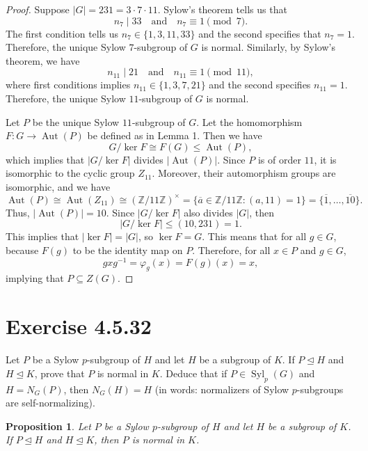 \documentclass[12pt]{article}
\newenvironment{problem}
    {\begin{lrbox}{\mybox}\begin{minipage}{0.98\textwidth}}
    {\end{minipage}\end{lrbox}\framebox[\textwidth]{\usebox{\mybox}}}
\newtheorem{proposition}{Proposition}
\newcommand{\isp}[1]{\quad\text{#1}\quad}
\newcommand{\Z}{\mathbb{Z}}
\renewcommand{\phi}{\varphi}
\newcommand{\teq}{\trianglelefteq}
\newcommand{\Syl}{\operatorname{Syl}}
\newcommand{\<}{\left\langle}
\renewcommand{\>}{\right\rangle}
\newcommand{\Aut}{\operatorname{Aut}}
\newcommand{\isom}{\cong}
\begin{document}
\begin{proof}
    Suppose $|G| = 231 = 3 \cdot 7 \cdot 11$. Sylow's theorem tells us that
    \[
        n_7 \mid 33 \isp{and} n_7 \equiv 1 \pmod{7}.
    \]
    The first condition tells us $n_7 \in \{1, 3, 11, 33\}$ and the second specifies that $n_7 = 1$. Therefore, the unique Sylow $7$-subgroup of $G$ is normal. Similarly, by Sylow's theorem, we have
    \[
        n_{11} \mid 21 \isp{and} n_{11} \equiv 1 \pmod{11},
    \]
    where first conditions implies $n_{11} \in \{1, 3, 7, 21\}$ and the second specifies $n_{11} = 1$. Therefore, the unique Sylow $11$-subgroup of $G$ is normal.
    
    Let $P$ be the unique Sylow $11$-subgroup of $G$. Let the homomorphism $F : G \to \Aut(P)$ be defined as in Lemma 1. Then we have
    \[
        G/\ker F \isom F(G) \leq \Aut(P),
    \]
    which implies that $|G/\ker F|$ divides $|\Aut(P)|$. Since $P$ is of order $11$, it is isomorphic to the cyclic group $Z_{11}$. Moreover, their automorphism groups are isomorphic, and we have
    \[
        \Aut(P) \isom \Aut(Z_{11}) \isom (\Z / 11\Z)^\times = \{\overline{a} \in \Z/11\Z : (a, 11) = 1\} = \{\overline{1}, \dots, \overline{10}\}.
    \]
    Thus, $|\Aut(P)| = 10$. Since $|G/\ker F|$ also divides $|G|$, then
    \[
        |G/\ker F| \leq (10, 231) = 1.
    \]
    This implies that $|\ker F| = |G|$, so $\ker F = G$. This means that for all $g \in G$, because $F(g)$ to be the identity map on $P$. Therefore, for all $x \in P$ and $g \in G$,
    \[
        gxg^{-1} = \phi_g(x) = F(g)(x) = x,
    \]
    implying that $P \subseteq Z(G)$.
    
\end{proof}

\newpage
\section{Exercise 4.5.32}
\begin{problem}
    Let $P$ be a Sylow $p$-subgroup of $H$ and let $H$ be a subgroup of $K$. If $P \teq H$ and $H \teq K$, prove that $P$ is normal in $K$. Deduce that if $P \in \Syl_p(G)$ and $H = N_G(P)$, then $N_G(H) = H$ (in words: normalizers of Sylow $p$-subgroups are self-normalizing).
\end{problem}

\begin{proposition}
    Let $P$ be a Sylow $p$-subgroup of $H$ and let $H$ be a subgroup of $K$. If $P \teq H$ and $H \teq K$, then $P$ is normal in $K$.
\end{proposition}
\end{document}
